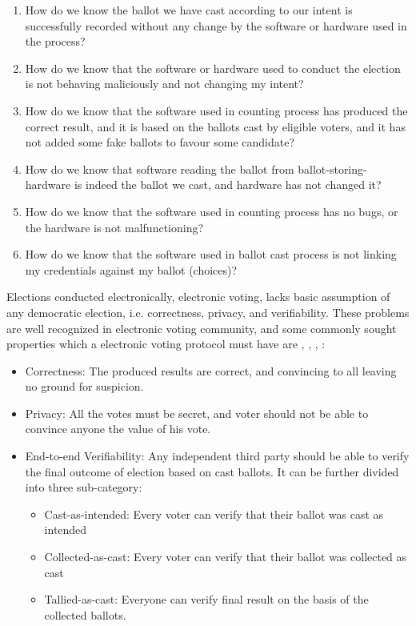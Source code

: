 	\begin{enumerate}
   \item How do we know the ballot we have cast according to our intent is successfully recorded 
   without any change by the software or hardware used in the process?
   \item How do we know that the software or hardware used to conduct the election is not 
   behaving maliciously and not  changing my intent? 
   \item How do we know that the software used in counting process has produced the correct result, and it
   is based on the ballots cast by eligible voters, and it has not added  some fake ballots to favour 
   some candidate?
   \item How do we know that software reading the ballot from ballot-storing-hardware 
    is indeed the ballot we cast, and hardware has not changed it? 
   \item How do we know that the software used in counting process has no bugs, or the hardware is 
    not malfunctioning? 
    \item How do we know that the software used in ballot cast process is not linking my credentials 
    against my ballot (choices)?
   \end{enumerate}
   
   
   Elections conducted  electronically, electronic voting, lacks basic assumption of any democratic 
	election, i.e. correctness, privacy, and verifiability.
	These problems are well recognized in electronic voting community, 
   and some commonly sought 
   properties which a electronic voting protocol must have are 
    \citep{5958051}, 
   \citep{Benaloh:1994:RSE:195058.195407},  \citep{Delaune:2010:VPT}, \citep{Bernhard:2017:PES}:
 \begin{itemize}
 
  \item Correctness:
 	The produced results are correct, and convincing to all leaving no  ground for suspicion. 
 	
 \item Privacy:
    All the votes must be secret, and voter should not be able to convince anyone the 
    value of his vote.
 
 \item End-to-end Verifiability:
 Any independent third party should be able to verify the final outcome of election based on cast 
 ballots.  It can be further divided into three sub-category:
 
 \begin{itemize}
  \item Cast-as-intended: Every voter can verify that their ballot was cast as
  intended
  \item Collected-as-cast: Every voter can verify that their ballot was collected as
  cast
  \item Tallied-as-cast: Everyone can verify final result on the basis of the
  collected ballots.
\end{itemize}
\end{itemize}
	

